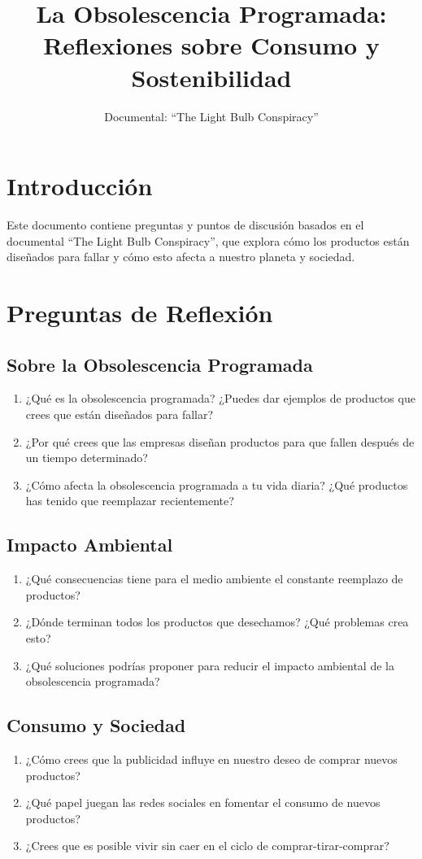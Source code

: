 \documentclass[12pt,a4paper]{article}
\title{La Obsolescencia Programada:\\ 
Reflexiones sobre Consumo y Sostenibilidad}
\author{Documental: ``The Light Bulb Conspiracy''}
\date{}
\begin{document}
\maketitle

\section*{Introducción}
Este documento contiene preguntas y puntos de discusión basados en el documental ``The Light Bulb Conspiracy'', que explora cómo los productos están diseñados para fallar y cómo esto afecta a nuestro planeta y sociedad.

\section{Preguntas de Reflexión}

\subsection*{Sobre la Obsolescencia Programada}
\begin{enumerate}
    \item ¿Qué es la obsolescencia programada? ¿Puedes dar ejemplos de productos que crees que están diseñados para fallar?
    \item ¿Por qué crees que las empresas diseñan productos para que fallen después de un tiempo determinado?
    \item ¿Cómo afecta la obsolescencia programada a tu vida diaria? ¿Qué productos has tenido que reemplazar recientemente?
\end{enumerate}

\subsection*{Impacto Ambiental}
\begin{enumerate}
    \item ¿Qué consecuencias tiene para el medio ambiente el constante reemplazo de productos?
    \item ¿Dónde terminan todos los productos que desechamos? ¿Qué problemas crea esto?
    \item ¿Qué soluciones podrías proponer para reducir el impacto ambiental de la obsolescencia programada?
\end{enumerate}

\subsection*{Consumo y Sociedad}
\begin{enumerate}
    \item ¿Cómo crees que la publicidad influye en nuestro deseo de comprar nuevos productos?
    \item ¿Qué papel juegan las redes sociales en fomentar el consumo de nuevos productos?
    \item ¿Crees que es posible vivir sin caer en el ciclo de comprar-tirar-comprar?
\end{enumerate}
\end{document}
